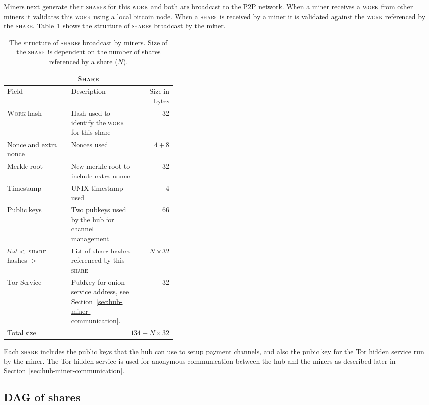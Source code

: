 \documentclass{article}
\begin{document}
Miners next generate their \textsc{share}s for this \textsc{work} and
both are broadcast to the P2P network. When a miner receives a
\textsc{work} from other miners it validates this \textsc{work} using
a local bitcoin node. When a \textsc{share} is received by a miner it
is validated against the \textsc{work} referenced by the
\textsc{share}. Table~\ref{table:share} shows the structure of
\textsc{share}s broadcast by the miner.


\begin{table}
  \centering
  \begin{tabular}{ lp{0.4\linewidth}r }
    \multicolumn{3}{c}{\textsc{Share}} \\
    \hline
    Field & Description & Size in bytes \\
    \hline
    \textsc{Work} hash & Hash used to identify the \textsc{work} for this share & 32 \\
    Nonce and extra nonce & Nonces used & $4+8$ \\
    Merkle root & New merkle root to include extra nonce & 32 \\
    Timestamp & UNIX timestamp used & 4 \\
    Public keys & Two pubkeys used by the hub for channel management & 66 \\
    $list<$ \textsc{share} hashes $>$ & List of share hashes referenced by this \textsc{share} & $N \times 32$ \\
    Tor Service & PubKey for onion service address, see Section~\ref{sec:hub-miner-communication}. & 32 \\
    \hline
    Total size & \multicolumn{2}{r}{$134 + N \times 32$} \\
    \hline
  \end{tabular}
  \caption{The structure of \textsc{share}s broadcast by miners. Size
    of the \textsc{share} is dependent on the number of shares
    referenced by a share ($N$).}\label{table:share}
\end{table}

Each \textsc{share} includes the public keys that the hub can use to
setup payment channels, and also the pubic key for the Tor hidden
service run by the miner. The Tor hidden service is used for anonymous
communication between the hub and the miners as described later in
Section~\ref{sec:hub-miner-communication}.

\subsection{DAG of shares}
\end{document}
